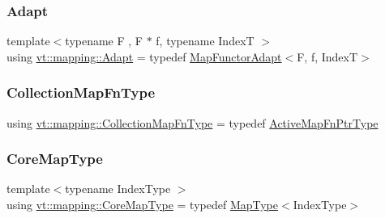 \mbox{\label{namespacevt_1_1mapping_aafe187035ce8df02f31983e37cdb6a5d}} 
\subsubsection{\texorpdfstring{Adapt}{Adapt}}
{\footnotesize\ttfamily template$<$typename F , F $\ast$ f, typename IndexT $>$ \\
using \hyperlink{namespacevt_1_1mapping_aafe187035ce8df02f31983e37cdb6a5d}{vt\+::mapping\+::\+Adapt} = typedef \hyperlink{namespacevt_1_1mapping_add4b5257a62b56d194f7e931b608f8f0}{Map\+Functor\+Adapt}$<$F, f, IndexT$>$}

\mbox{\label{namespacevt_1_1mapping_a2910ab582d95478603cdca7480af65b2}} 
\subsubsection{\texorpdfstring{Collection\+Map\+Fn\+Type}{CollectionMapFnType}}
{\footnotesize\ttfamily using \hyperlink{namespacevt_1_1mapping_a2910ab582d95478603cdca7480af65b2}{vt\+::mapping\+::\+Collection\+Map\+Fn\+Type} = typedef \hyperlink{namespacevt_1_1mapping_a748d5efb71ca5878288d5809f57d7254}{Active\+Map\+Fn\+Ptr\+Type}}

\mbox{\label{namespacevt_1_1mapping_abff207bec72f006a2e66ff14fc51255a}} 
\subsubsection{\texorpdfstring{Core\+Map\+Type}{CoreMapType}}
{\footnotesize\ttfamily template$<$typename Index\+Type $>$ \\
using \hyperlink{namespacevt_1_1mapping_abff207bec72f006a2e66ff14fc51255a}{vt\+::mapping\+::\+Core\+Map\+Type} = typedef \hyperlink{namespacevt_1_1mapping_a443f8bb8920af5ae1d3391f61fe492a6}{Map\+Type}$<$Index\+Type$>$}

\mbox{\label{namespacevt_1_1mapping_a963a37316992c8805e9a381a07380de0}} 
